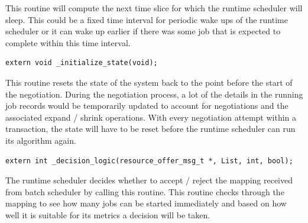This routine will compute the next time slice for which the runtime scheduler will sleep. This could be a fixed time interval for periodic wake ups of the runtime scheduler or it can wake up earlier if there was some job that is expected to complete within this time interval.
\begin{lstlisting}[mathescape,frame=single]
extern void _initialize_state(void);
\end{lstlisting}
This routine resets the state of the system back to the point before the start of the negotiation. During the negotiation process, a lot of the details in the running job records would be temporarily updated to account for negotiations and the associated expand / shrink operations. With every negotiation attempt within a transaction, the state will have to be reset before the runtime scheduler can run its algorithm again.\\
\begin{lstlisting}[mathescape,frame=single]
extern int _decision_logic(resource_offer_msg_t *, List, int, bool);
\end{lstlisting}
The runtime scheduler decides whether to accept / reject the mapping received from batch scheduler by calling this routine. This routine checks through the mapping to see how many jobs can be started immediately and based on how well it is suitable for its metrics a decision will be taken.

